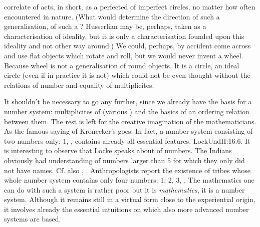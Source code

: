 {  correlate of acts, in short, as a perfected  of imperfect
  circles, no matter how often encountered in nature.  (What would determine the
  direction of such a generalisation, of such a ? Husserlian  may be,
  perhaps, taken as a characterisation of ideality, but it is only a
  characterisation founded upon this ideality and not other way around.)  We
  could, perhaps, by accident come across and use flat objects which rotate and
  roll, but we would never invent a wheel.  Because wheel is not a
  generalisation of round objects.  It is a circle, an ideal circle (even if in
  practice it is not) which could not be even thought without the relations of
  number and equality of multiplicites. }

\newp 

\pa It shouldn't be necessary to go any further, since we already have the basis
for a number system: multiplicites of  (various
) and the basics of an ordering relation between them.  The rest is
left for the creative imagination of the mathematicians. As the famous saying of
Kronecker's goes:  In fact, a number system consisting of two
numbers only: 1, , contains already all essential features.
\citet{The Tououpinambos [native Americans I have spoken with] had no names for
  numbers above 5; any number beyond that they made out by showing their
  fingers, and the fingers of others who were present.}{LockUnd}{II:16.6.  It is
  interesting to observe that Locke speaks about  of numbers.  The
  Indians obviously had understanding of numbers larger than 5 for which they
  only did not have names. Cf. also \citeauthor*{SavageMind},
  \citeauthor*{Hartner}.}  Anthropologists report the existence of tribes whose
whole number system contains only four numbers: 1, 2, 3, .  The
mathematics one can do with such a system is rather poor but it is {\em
  mathematics}, it is a number system.  Although it remains still in a virtual
form close to the experiential origin, it involves already the essential
intuitions on which also more advanced number systems are based.



